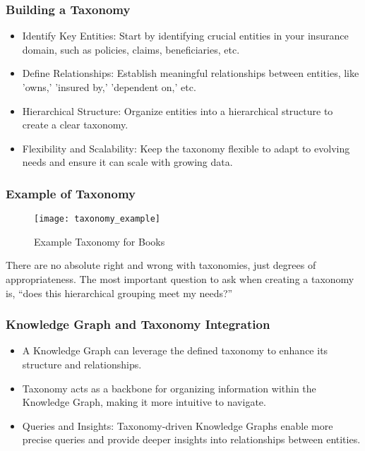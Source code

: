 \begin{frame}[fragile]
\frametitle{Building a Taxonomy}
\begin{itemize}
\item Identify Key Entities: Start by identifying crucial entities in your insurance domain, such as policies, claims, beneficiaries, etc.
\item Define Relationships: Establish meaningful relationships between entities, like 'owns,' 'insured by,' 'dependent on,' etc.
\item Hierarchical Structure: Organize entities into a hierarchical structure to create a clear taxonomy.
\item Flexibility and Scalability: Keep the taxonomy flexible to adapt to evolving needs and ensure it can scale with growing data.
\end{itemize}
\end{frame}

\begin{frame}[fragile]
\frametitle{Example of Taxonomy}
\begin{figure}[h]
\centering
\texttt{[image: taxonomy\_example]}
\caption{Example Taxonomy for Books}
\end{figure}

There are no absolute right and wrong with taxonomies, just degrees of appropriateness. The most important question to ask when creating a taxonomy is, “does this hierarchical grouping meet my needs?”
\end{frame}

\begin{frame}[fragile]
\frametitle{Knowledge Graph and Taxonomy Integration}
\begin{itemize}
\item A Knowledge Graph can leverage the defined taxonomy to enhance its structure and relationships.
\item Taxonomy acts as a backbone for organizing information within the Knowledge Graph, making it more intuitive to navigate.
\item Queries and Insights: Taxonomy-driven Knowledge Graphs enable more precise queries and provide deeper insights into relationships between entities.
\end{itemize}
\end{frame}

